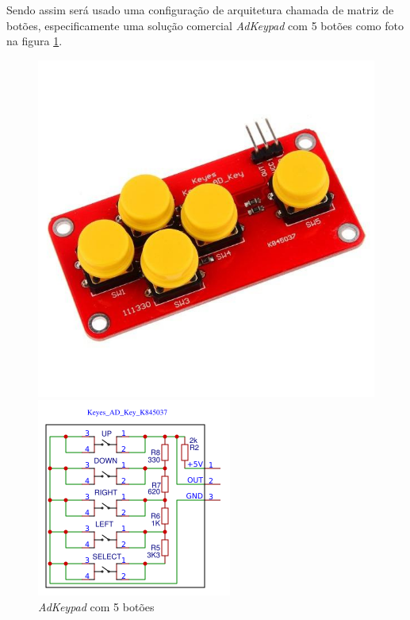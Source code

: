         
        Sendo assim será usado uma configuração de arquitetura chamada de matriz de botões, especificamente uma solução comercial \textit{AdKeypad} com 5 botões como foto na figura \ref{fig:keypad_ft}.
        
        \begin{figure}[H]
          \centering
          \begin{minipage}[b]{0.3\textwidth}
            \includegraphics[width=\textwidth]{figuras/adkeypad.jpg}
            \caption{\textit{AdKeypad} com 5 botões}
            \label{fig:keypad_ft}
          \end{minipage}
          \hspace{2cm}
          \begin{minipage}[b]{0.3\textwidth}
            \includegraphics[width=\textwidth]{figuras/adkeypad_schematic.png}

\end{minipage}
\end{figure}

